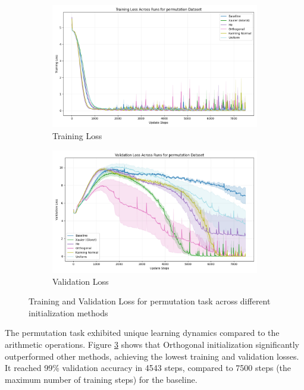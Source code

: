 \documentclass{article} %
\begin{document}
\begin{figure}[h]
    \centering
    \begin{subfigure}{0.49\textwidth}
        \includegraphics[width=\textwidth]{train_loss_permutation.png}
        \caption{Training Loss}
        \label{fig:train_loss_permutation}
    \end{subfigure}
    \hfill
    \begin{subfigure}{0.49\textwidth}
        \includegraphics[width=\textwidth]{val_loss_permutation.png}
        \caption{Validation Loss}
        \label{fig:val_loss_permutation}
    \end{subfigure}
    \caption{Training and Validation Loss for permutation task across different initialization methods}
    \label{fig:loss_permutation}
\end{figure}

The permutation task exhibited unique learning dynamics compared to the arithmetic operations. Figure \ref{fig:loss_permutation} shows that Orthogonal initialization significantly outperformed other methods, achieving the lowest training and validation losses. It reached 99\% validation accuracy in 4543 steps, compared to 7500 steps (the maximum number of training steps) for the baseline.
\end{document}
